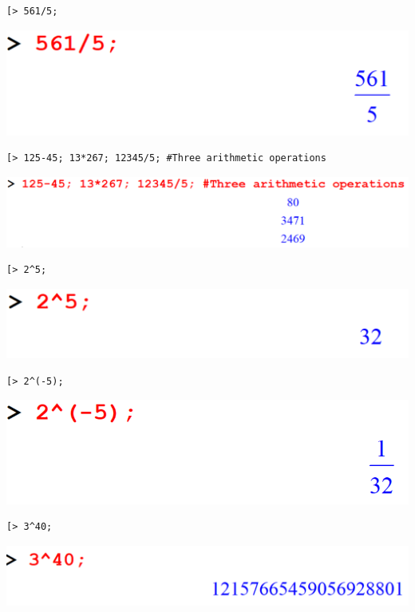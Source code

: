 \documentclass[
]{book}
\theoremstyle{definition}
\theoremstyle{definition}
\theoremstyle{definition}
\theoremstyle{definition}
\theoremstyle{remark}
\begin{document}
\begin{verbatim}
[> 561/5;
\end{verbatim}

\includegraphics{figures/Lesson 1/fig8.png}

\begin{verbatim}
[> 125-45; 13*267; 12345/5; #Three arithmetic operations
\end{verbatim}

\includegraphics{figures/Lesson 1/fig9.png}

\begin{verbatim}
[> 2^5;
\end{verbatim}

\includegraphics{figures/Lesson 1/fig10.png}

\begin{verbatim}
[> 2^(-5);
\end{verbatim}

\includegraphics{figures/Lesson 1/fig11.png}

\begin{verbatim}
[> 3^40;
\end{verbatim}

\includegraphics{figures/Lesson 1/fig12.png}
\end{document}
